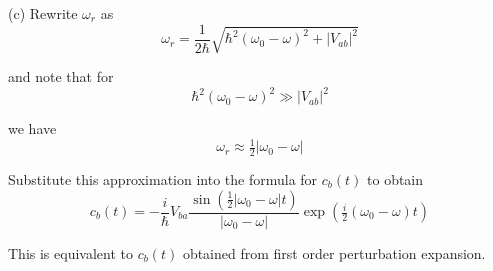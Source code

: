 (c) Rewrite $\omega_r$ as
\begin{equation*}
\omega_r=\frac{1}{2\hbar}\sqrt{\hbar^2(\omega_0-\omega)^2+|V_{ab}|^2}
\end{equation*}

and note that for
\begin{equation*}
\hbar^2(\omega_0-\omega)^2\gg|V_{ab}|^2
\end{equation*}

we have
\begin{equation*}
\omega_r\approx\tfrac{1}{2}|\omega_0-\omega|
\end{equation*}

Substitute this approximation into the formula for $c_b(t)$ to obtain
\begin{equation*}
c_b(t)=-\frac{i}{\hbar}V_{ba}
\frac{\sin\left(\tfrac{1}{2}|\omega_0-\omega|t\right)}{|\omega_0-\omega|}
\exp\left(\tfrac{i}{2}(\omega_0-\omega)t\right)
\end{equation*}

This is equivalent to $c_b(t)$ obtained from first order perturbation expansion.


